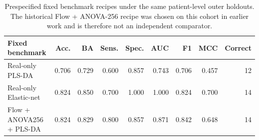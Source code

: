 \begin{table}[t]
\centering
\caption{Prespecified fixed benchmark recipes under the same patient-level outer holdouts. The historical Flow + ANOVA-256 recipe was chosen on this cohort in earlier work and is therefore not an independent comparator.}
\label{tab:fixed_benchmarks}
\footnotesize
\setlength{\tabcolsep}{4pt}
\begin{tabular}{lrrrrrrrr}
\toprule
Fixed benchmark & Acc. & BA & Sens. & Spec. & AUC & F1 & MCC & Correct \\
\midrule
Real-only PLS-DA & 0.706 & 0.729 & 0.600 & 0.857 & 0.743 & 0.706 & 0.457 & 12 \\
Real-only Elastic-net & 0.824 & 0.850 & 0.700 & 1.000 & 1.000 & 0.824 & 0.700 & 14 \\
Flow + ANOVA256 + PLS-DA & 0.824 & 0.829 & 0.800 & 0.857 & 0.871 & 0.842 & 0.648 & 14 \\
\bottomrule
\end{tabular}
\end{table}

